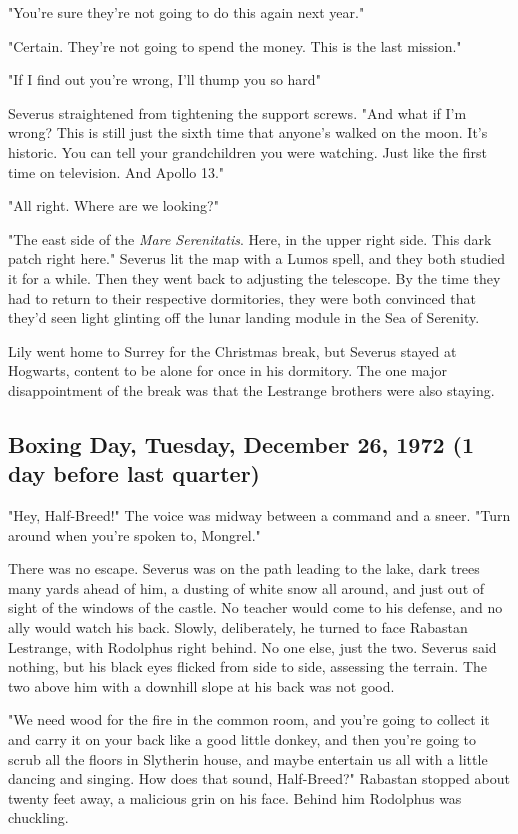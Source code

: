 "You're sure they're not going to do this again next year."

"Certain. They're not going to spend the money. This is the last mission."

"If I find out you're wrong, I'll thump you so hard{\el}"

Severus straightened from tightening the support screws. "And what if I'm wrong? This is still just the sixth time that anyone's walked on the moon. It's historic. You can tell your grandchildren you were watching. Just like the first time on television. And Apollo 13."

"All right. Where are we looking?"

"The east side of the \emph{Mare Serenitatis}. Here, in the upper right side. This dark patch right here." Severus lit the map with a Lumos spell, and they both studied it for a while. Then they went back to adjusting the telescope. By the time they had to return to their respective dormitories, they were both convinced that they'd seen light glinting off the lunar landing module in the Sea of Serenity.

Lily went home to Surrey for the Christmas break, but Severus stayed at Hogwarts, content to be alone for once in his dormitory. The one major disappointment of the break was that the Lestrange brothers were also staying.

\subsection{Boxing Day, Tuesday, December 26, 1972 (1 day before last quarter)}

"Hey, Half-Breed!" The voice was midway between a command and a sneer. "Turn around when you're spoken to, Mongrel."

There was no escape. Severus was on the path leading to the lake, dark trees many yards ahead of him, a dusting of white snow all around, and just out of sight of the windows of the castle. No teacher would come to his defense, and no ally would watch his back. Slowly, deliberately, he turned to face Rabastan Lestrange, with Rodolphus right behind. No one else, just the two. Severus said nothing, but his black eyes flicked from side to side, assessing the terrain. The two above him with a downhill slope at his back was not good.

"We need wood for the fire in the common room, and you're going to collect it and carry it on your back like a good little donkey, and then you're going to scrub all the floors in Slytherin house, and maybe entertain us all with a little dancing and singing. How does that sound, Half-Breed?" Rabastan stopped about twenty feet away, a malicious grin on his face. Behind him Rodolphus was chuckling.

